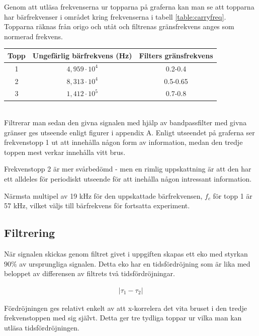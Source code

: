 \documentclass[a4paper,12pt,fleqn]{article}
\begin{document}
Genom att utläsa frekvenserna ur topparna på graferna kan man se att topparna har bärfrekvenser i området kring frekvenserna i tabell \ref{table:carryfreq}. Topparna räknas från origo och utåt och filtrenas gränsfrekvens anges som normerad frekvens. 
~\\
\begin{center}
\begin{tabular}{c | c | c}
	\hline
	Topp & Ungefärlig bärfrekvens (Hz) & Filters gränsfrekvens \\ \hline
	1 & $4,959 \cdot 10^4$ & 0.2-0.4 \\ \hline
	2 & $8,313 \cdot 10^4$ & 0.5-0.65 \\ \hline
	3 & $1,412 \cdot 10^5$ & 0.7-0.8 \\ \hline
\end{tabular}
 \label{table:carryfreq}
\end{center}
~\\
Filtrerar man sedan den givna signalen med hjälp av bandpassfilter med givna gränser ges utseende enligt figurer i appendix A. Enligt utseendet på graferna ser frekvenstopp 1 ut att innehålla någon form av information, medan den tredje toppen mest verkar innehålla vitt brus. 

Frekvenstopp 2 är mer svårbedömd - men en rimlig uppskattning är att den har ett alldeles för periodiskt utseende för att inehålla någon intressant information. 

Närmsta multipel av 19 kHz för den uppskattade bärfrekvensen, $f_c$ för topp 1 är 57 kHz, vilket väljs till bärfrekvens för fortsatta experiment. 

\newpage

\subsection{Filtrering}

När signalen skickas genom filtret givet i uppgiften skapas ett eko med styrkan $90\%$ av ursprungliga signalen. Detta eko har en tidsfördröjning som är lika med beloppet av differensen av filtrets två tidsfördröjningar.

\begin{gather}
|\tau_1 - \tau_2|
\label{equ:delay}
\end{gather}

Fördröjningen ges relativt enkelt av att x-korrelera det vita bruset i den tredje frekvenstoppen med sig självt. Detta ger tre tydliga toppar ur vilka man kan utläsa tidsfördröjningen. 
\end{document}
